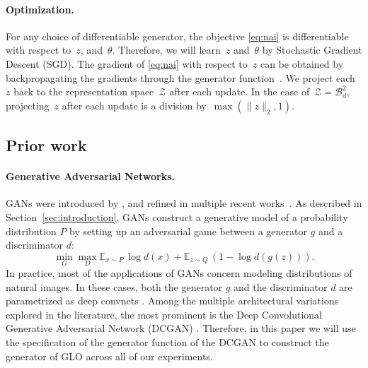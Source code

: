 \documentclass{article}
\newcommand{\GNAT}{GLO}
\begin{document}
\paragraph{Optimization.}
For any choice of differentiable generator, the objective \eqref{eq:nai} is
differentiable with respect to~$z$, and~$\theta$.
Therefore, we will learn~$z$ and~$\theta$ by Stochastic Gradient Descent (SGD).
The gradient of \eqref{eq:nai} with respect to~$z$ can be
obtained by backpropagating the gradients through the generator
function~\citep{compressed}. We project each~$z$ back to the representation
space~$\mathcal{Z}$ after each update. In the case of~$\mathcal{Z} =
\mathcal{B}_d^2$, projecting~$z$ after each update is a division by~$\max(\|z\|_2, 1)$.

\subsection{Prior work}

\paragraph{Generative Adversarial Networks.}
GANs were introduced by \citet{gan}, and
refined in multiple recent
works~\citep{denton2015deep,dcgan,zhao2016energy,salimans2016improved}.
As described in Section~\ref{sec:introduction}, GANs construct a generative
model of a probability distribution $P$ by setting up an
adversarial game between a generator $g$ and a discriminator $d$:
\begin{equation*}
  \label{eq:gan}
  \min_G \max_D \mathbb{E}_{x\sim P}\, \log d(x) + \mathbb{E}_{z \sim Q}\,
  (1-\log d(g(z))).
\end{equation*}
In practice, most of the applications of GANs concern modeling
distributions of natural images. In these cases, both the generator $g$ and
the discriminator $d$ are parametrized as deep convnets
\citep{lecun1998gradient}. Among the multiple architectural variations
explored in the literature, the most prominent is the Deep Convolutional
Generative Adversarial Network (DCGAN) \citep{dcgan}. Therefore, in this paper
we will use the specification of the generator function of the DCGAN to
construct the generator of \GNAT{} across all of our experiments.
\end{document}
